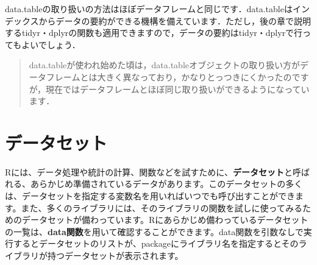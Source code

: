 \documentclass[
  letterpaper,
  DIV=11,
  numbers=noendperiod]{scrreprt}
\newenvironment{Shaded}{\begin{snugshade}}{\end{snugshade}}
\newcommand{\CommentTok}[1]{\textcolor[rgb]{0.37,0.37,0.37}{#1}}
\newcommand{\DecValTok}[1]{\textcolor[rgb]{0.68,0.00,0.00}{#1}}
\newcommand{\FunctionTok}[1]{\textcolor[rgb]{0.28,0.35,0.67}{#1}}
\newcommand{\NormalTok}[1]{\textcolor[rgb]{0.00,0.23,0.31}{#1}}
\newcommand{\SpecialCharTok}[1]{\textcolor[rgb]{0.37,0.37,0.37}{#1}}
\newcommand{\StringTok}[1]{\textcolor[rgb]{0.13,0.47,0.30}{#1}}
\begin{document}
data.tableの取り扱いの方法はほぼデータフレームと同じです．data.tableはインデックスからデータの要約ができる機構を備えています．ただし，後の章で説明するtidyr・dplyrの関数も適用できますので，データの要約はtidyr・dplyrで行ってもよいでしょう．

\begin{Shaded}
\end{Shaded}

\begin{quote}
data.tableが使われ始めた頃は，data.tableオブジェクトの取り扱い方がデータフレームとは大きく異なっており，かなりとっつきにくかったのですが，現在ではデータフレームとほぼ同じ取り扱いができるようになっています．
\end{quote}


\hypertarget{ux30c7ux30fcux30bfux30bbux30c3ux30c8}{%
\chapter{データセット}\label{ux30c7ux30fcux30bfux30bbux30c3ux30c8}}

Rには、データ処理や統計の計算、関数などを試すために、\textbf{データセット}と呼ばれる、あらかじめ準備されているデータがあります。このデータセットの多くは、データセットを指定する変数名を用いればいつでも呼び出すことができます。また、多くのライブラリには、そのライブラリの関数を試しに使ってみるためのデータセットが備わっています。Rにあらかじめ備わっているデータセットの一覧は、\textbf{data関数}を用いて確認することができます。data関数を引数なしで実行するとデータセットのリストが、packageにライブラリ名を指定するとそのライブラリが持つデータセットが表示されます。
\end{document}
